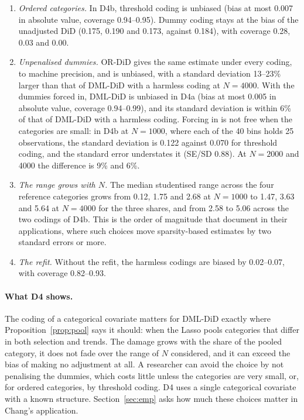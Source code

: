 \documentclass[11pt]{article}
\newenvironment{ins}{\begin{leftbar}}{\end{leftbar}}
\theoremstyle{plain}
\theoremstyle{remark}
\begin{document}
\begin{ins}
\begin{enumerate}
  that a specification is unbiased.
\item \emph{Ordered categories.} In D4b, threshold coding is unbiased (bias at
  most 0.007 in absolute value, coverage 0.94--0.95). Dummy coding stays at the
  bias of the unadjusted DiD (0.175, 0.190 and 0.173, against 0.184), with
  coverage 0.28, 0.03 and 0.00.
\item \emph{Unpenalised dummies.} OR-DiD gives the same estimate under every
  coding, to machine precision, and is unbiased, with a standard deviation 13--23\%
  larger than that of DML-DiD with a harmless coding at $N=4000$. With the
  dummies forced in, DML-DiD is unbiased in D4a (bias at most 0.005 in absolute
  value, coverage 0.94--0.99), and its standard deviation is within 6\% of that
  of DML-DiD with a harmless coding. Forcing in is not free when the categories
  are small: in D4b at $N=1000$, where each of the 40 bins holds 25
  observations, the standard deviation is 0.122 against 0.070 for threshold
  coding, and the standard error understates it (SE/SD 0.88). At $N=2000$ and
  4000 the difference is 9\% and 6\%.
\item \emph{The range grows with $N$.} The median studentised range across the
  four reference categories grows from 0.12, 1.75 and 2.68 at $N=1000$ to 1.47,
  3.63 and 5.64 at $N=4000$ for the three shares, and from 2.58 to 5.06 across
  the two codings of D4b. This is the order of magnitude that
  \textcite{kolesar2026fragility} document in their applications, where such
  choices move sparsity-based estimates by two standard errors or more.
\item \emph{The refit.} Without the refit, the harmless codings are biased by
  0.02--0.07, with coverage 0.82--0.93.
\end{enumerate}

\paragraph{What D4 shows.} The coding of a categorical covariate matters for
DML-DiD exactly where Proposition~\ref{prop:pool} says it should: when the Lasso
pools categories that differ in both selection and trends. The damage grows with
the share of the pooled category, it does not fade over the range of $N$
considered, and it can exceed the bias of making no adjustment at all. A
researcher can avoid the choice by not penalising the dummies, which costs
little unless the categories are very small, or, for ordered categories, by
threshold coding. D4 uses a single categorical covariate with a known structure.
Section~\ref{sec:emp} asks how much these choices matter in Chang's application.
\end{ins}
\end{document}
